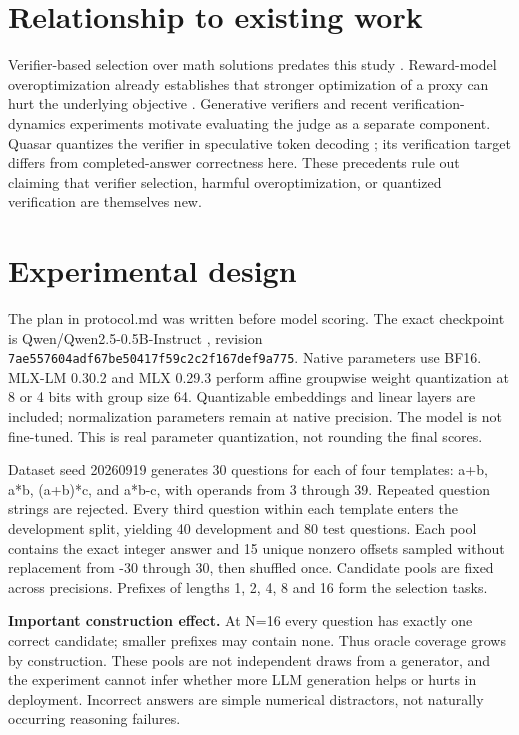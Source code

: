 \documentclass[11pt,letterpaper]{article}
\begin{document}
\section{Relationship to existing work}

Verifier-based selection over math solutions predates this study \cite{ref1}. Reward-model overoptimization already establishes that stronger optimization of a proxy can hurt the underlying objective \cite{ref2}. Generative verifiers \cite{ref3} and recent verification-dynamics experiments \cite{ref4} motivate evaluating the judge as a separate component. Quasar quantizes the verifier in speculative token decoding \cite{ref5}; its verification target differs from completed-answer correctness here. These precedents rule out claiming that verifier selection, harmful overoptimization, or quantized verification are themselves new.


\section{Experimental design}

The plan in protocol.md was written before model scoring. The exact checkpoint is Qwen/Qwen2.5-0.5B-Instruct \cite{ref6}, revision \nolinkurl{7ae557604adf67be50417f59c2c2f167def9a775}. Native parameters use BF16. MLX-LM 0.30.2 and MLX 0.29.3 \cite{ref8} perform affine groupwise weight quantization at 8 or 4 bits with group size 64. Quantizable embeddings and linear layers are included; normalization parameters remain at native precision. The model is not fine-tuned. This is real parameter quantization, not rounding the final scores.


Dataset seed 20260919 generates 30 questions for each of four templates: a+b, a*b, (a+b)*c, and a*b-c, with operands from 3 through 39. Repeated question strings are rejected. Every third question within each template enters the development split, yielding 40 development and 80 test questions. Each pool contains the exact integer answer and 15 unique nonzero offsets sampled without replacement from -30 through 30, then shuffled once. Candidate pools are fixed across precisions. Prefixes of lengths 1, 2, 4, 8 and 16 form the selection tasks.


\textbf{Important construction effect.} At N=16 every question has exactly one correct candidate; smaller prefixes may contain none. Thus oracle coverage grows by construction. These pools are not independent draws from a generator, and the experiment cannot infer whether more LLM generation helps or hurts in deployment. Incorrect answers are simple numerical distractors, not naturally occurring reasoning failures.
\end{document}
